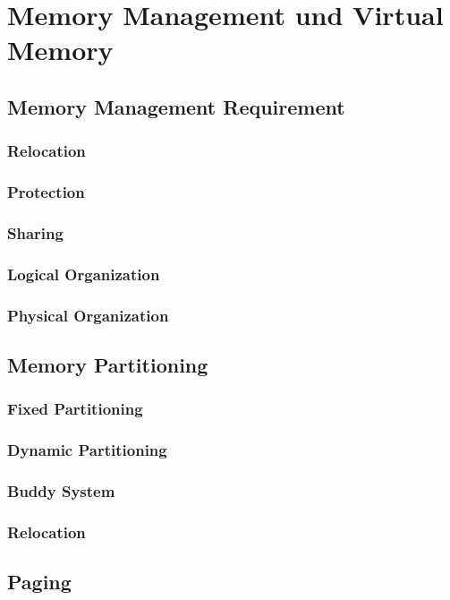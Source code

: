 \section{Memory Management und Virtual Memory}

\subsection{Memory Management Requirement}
\subsubsection{Relocation}
\subsubsection{Protection}
\subsubsection{Sharing}
\subsubsection{Logical Organization}
\subsubsection{Physical Organization}

\subsection{Memory Partitioning}
\subsubsection{Fixed Partitioning}
\subsubsection{Dynamic Partitioning}
\subsubsection{Buddy System}
\subsubsection{Relocation}

\subsection{Paging}

